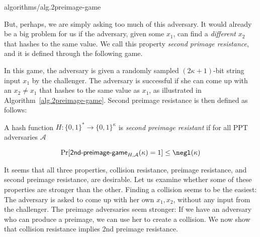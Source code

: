{algorithms/alg.2preimage-game}

But, perhaps, we are simply asking too much of this adversary. It would already be a big problem
for us if the adversary, given some $x_1$, can find a \emph{different} $x_2$ that hashes to the same
value. We call this property \emph{second primage resistance}, and it is defined through the following
game.

In this game, the adversary is given a randomly sampled $(2\kappa+1)$-bit string input $x_1$ by the challenger.
The adversary is successful if she can come up with an $x_2 \neq x_1$ that hashes to the same value as $x_1$,
as illustrated in Algorithm~\ref{alg.2preimage-game}.
Second preimage resistance is then defined as follows:

\begin{definition}
  A hash function $H: \{0, 1\}^* \longrightarrow \{0, 1\}^\kappa$ is \emph{second preimage resistant}
  if for all PPT adversaries $\mathcal{A}$

  \[
    \Pr[\textsf{2nd-preimage-game}_{H,\mathcal{A}}(\kappa) = 1] \leq \negl(\kappa)
  \]
\end{definition}

It seems that all three properties, collision resistance, preimage resistance, and second preimage
resistance, are desirable. Let us examine whether some of these properties are stronger than the other.
Finding a collision seems to be the easiest: The adversary is asked to come up with her own $x_1, x_2$,
without any input from the challenger. The preimage adversaries seem stronger: If we have
an adversary who can produce a preimage, we can use her to create a collision.
We now show that collision resistance implies 2nd preimage resistance.

